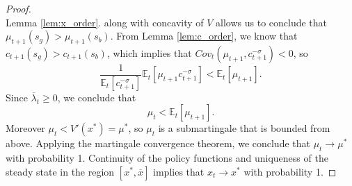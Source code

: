 \documentclass[12pt]{article}
\newcommand{\EE}{\mathbb E}
\begin{document}
\begin{proof}
{\[\]  Lemma  \ref{lem:x_order}. along with concavity of $V$ allows us to conclude that $\mu_{t+1}(s_g) > \mu_{t+1}(s_b)$.  From Lemma \ref{lem:c_order}, we know that $c_{t+1}(s_g) > c_{t+1}(s_b)$, which implies that $Cov_t(\mu_{t+1},c_{t+1}^{-\sigma}) <0$, so
\[
	 \frac{1}{\EE_t[c_{t+1}^{-\sigma}]}\EE_t[\mu_{t+1}c_{t+1}^{-\sigma}]  < \EE_t[\mu_{t+1}].
\] Since $\overline \lambda_t \geq 0$, we  conclude that
\[
	\mu_t < \EE_t[\mu_{t+1}].
\]  Moreover $\mu_t < V'(x^*) = \mu^*$, so $\mu_t$ is a submartingale that is bounded from above.  Applying the martingale convergence theorem, we conclude that $\mu_t \rightarrow \mu^*$ with probability 1.  Continuity of the policy functions and uniqueness of the steady state in the region $[x^*,\overline x]$ implies that $x_t\rightarrow x^*$ with probability 1.}
\end{proof}
\end{document}
